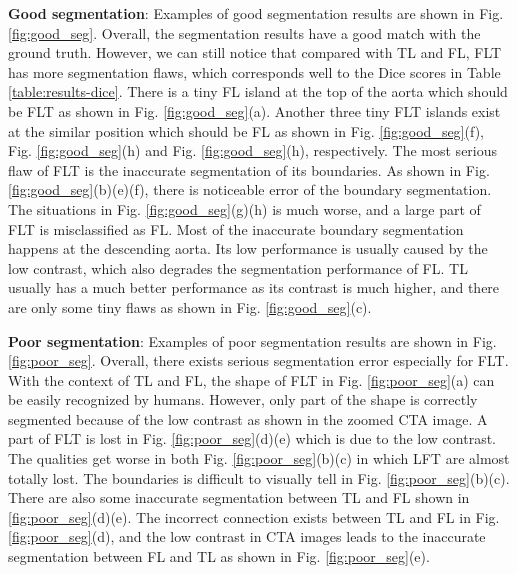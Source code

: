 \documentclass{article}
\begin{document}
\noindent\textbf{Good segmentation}: 
Examples of good segmentation results are shown in Fig. \ref{fig:good_seg}.
Overall, the segmentation results have a good match with the ground truth.
However, we can still notice that compared with TL and FL, FLT has more segmentation flaws, which corresponds well to the Dice scores in Table \ref{table:results-dice}.
There is a tiny FL island at the top of the aorta which should be FLT as shown in Fig. \ref{fig:good_seg}(a).
Another three tiny FLT islands exist at the similar position which should be FL as shown in Fig. \ref{fig:good_seg}(f),  Fig. \ref{fig:good_seg}(h) and Fig. \ref{fig:good_seg}(h), respectively.
The most serious flaw of FLT is the inaccurate segmentation of its boundaries.
As shown in Fig. \ref{fig:good_seg}(b)(e)(f), there is noticeable error of the boundary segmentation.
The situations in Fig. \ref{fig:good_seg}(g)(h) is much worse, and a large part of FLT is misclassified as FL.
Most of the inaccurate boundary segmentation happens at the descending aorta.
Its low performance is usually caused by the low contrast, which also degrades the segmentation performance of FL.
TL usually has a much better performance as its contrast is much higher, and there are only some tiny flaws as shown in Fig. \ref{fig:good_seg}(c).






\noindent\textbf{Poor segmentation}:
Examples of poor segmentation results are shown in Fig. \ref{fig:poor_seg}.
Overall, there exists serious segmentation error especially for FLT.
With the context of TL and FL, the shape of FLT in Fig. \ref{fig:poor_seg}(a) can be easily recognized by humans.
However, only part of the shape is correctly segmented because of the low contrast as shown in the zoomed CTA image.
A part of FLT is lost in Fig. \ref{fig:poor_seg}(d)(e) which is due to the low contrast.
The qualities get worse in both Fig. \ref{fig:poor_seg}(b)(c) in which LFT are almost totally lost.
The boundaries is difficult to visually tell in Fig. \ref{fig:poor_seg}(b)(c).
There are also some inaccurate segmentation between TL and FL shown in \ref{fig:poor_seg}(d)(e).
The incorrect connection exists between TL and FL in Fig. \ref{fig:poor_seg}(d), and the low contrast in CTA images leads to the inaccurate segmentation between FL and TL as shown in Fig. \ref{fig:poor_seg}(e).
\end{document}
